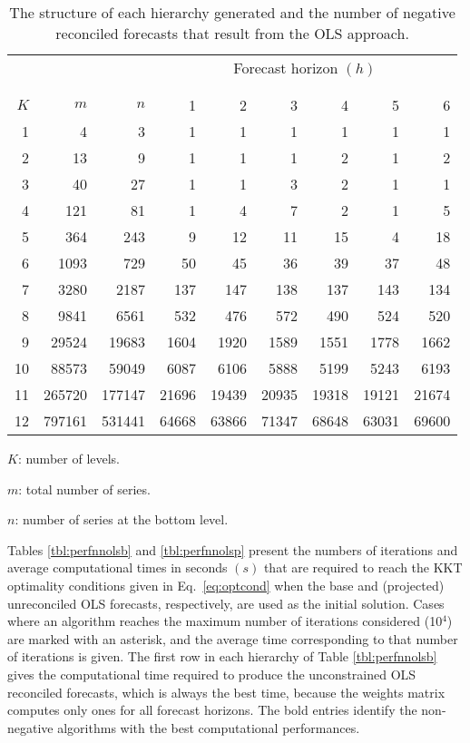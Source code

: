 \documentclass[11pt]{article}
\newcommand{\0}{\phantom{0}}
\begin{document}
\begin{table}[ht]
	\caption{The structure of each hierarchy generated and the number of negative reconciled forecasts that result from the OLS approach.}
	\label{tbl:negstrols}
	\centering
	\begin{threeparttable}
		\begin{tabular}{rrrrrrrrr}
			\toprule
			& & & \multicolumn{6}{c}{Forecast horizon $(h)$}\\[-0.3cm]\\\cline{4-9}\\[-0.3cm]
			$K$ & $m$ & $n$ & 1 & 2 & 3 & 4 & 5 & 6\\ 
			\midrule
			1 & 4 & 3 & 1 & 1 & 1 & 1 & 1 & 1 \\
			2 & 13 & 9 & 1 & 1 & 1 & 2 & 1 & 2\\
			3 & 40 & 27 & 1 & 1 & 3 & 2 & 1 & 1\\
			4 & 121 & 81 & 1 & 4 & 7 & 2 & 1 & 5 \\
			5 & 364 & 243 & 9 & 12 & 11 & 15 & 4 & 18 \\
			6 & 1093 & 729 & 50 & 45 & 36 & 39 & 37 & 48 \\
			7 & 3280 & 2187 & 137 & 147 & 138 & 137 & 143 & 134 \\
			8 & 9841 & 6561 & 532 & 476 & 572 & 490 & 524 & 520 \\
			9 & 29524 & 19683 & 1604 & 1920 & 1589 & 1551 & 1778 & 1662 \\
			10 & 88573 & 59049 & 6087 & 6106 & 5888 & 5199 & 5243 & 6193 \\
			11 & 265720 & 177147 & 21696 & 19439 & 20935 & 19318 & 19121 & 21674 \\
			12 & 797161 & 531441 & 64668 & 63866 & 71347 & 68648 & 63031 & 69600 \\
			\bottomrule
		\end{tabular}
		\begin{tablenotes}
			\item [] $K$: number of levels.
			\item [] $m$: total number of series.
			\item [] $n$: number of series at the bottom level.	
		\end{tablenotes}
	\end{threeparttable}
\end{table}

Tables \ref{tbl:perfnnolsb} and \ref{tbl:perfnnolsp} present the numbers of iterations and average computational times in seconds $(s)$ that are required to reach the KKT optimality conditions given in Eq.\ \eqref{eq:optcond} when the base and (projected) unreconciled OLS forecasts, respectively, are used as the initial solution. Cases where an algorithm reaches the maximum number of iterations considered (10$^{4}$) are marked with an asterisk, and the average time corresponding to that number of iterations is given. The first row in each hierarchy of Table \ref{tbl:perfnnolsb} gives the computational time required to produce the unconstrained OLS reconciled forecasts, which is always the best time, because the weights matrix computes only ones for all forecast horizons. The bold entries identify the non-negative algorithms with the best computational performances. 
\end{document}
